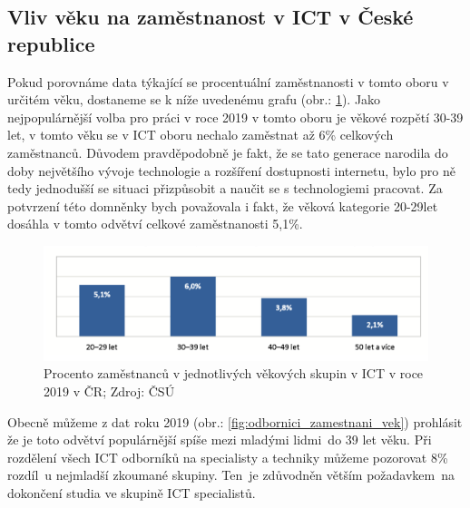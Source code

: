 \documentclass[12pt]{report}			%
\begin{document}
            \subsection{Vliv věku na zaměstnanost v ICT v České republice}
                
                Pokud porovnáme data týkající se procentuální zaměstnanosti v tomto oboru v určitém věku, dostaneme se k níže uvedenému grafu (obr.: \ref{fig:odbornici_vek}). Jako nejpopulárnější volba pro práci v roce 2019 v tomto oboru je věkové rozpětí 30-39 let, v tomto věku se v ICT oboru nechalo zaměstnat až 6\% celkových zaměstnanců. Důvodem pravděpodobně je fakt, že se tato generace narodila do doby největšího vývoje technologie a rozšíření dostupnosti internetu, bylo pro ně tedy jednodušší se situaci přizpůsobit a naučit se s technologiemi pracovat. Za potvrzení této domněnky bych považovala i fakt, že věková kategorie 20-29let dosáhla v tomto odvětví celkové zaměstnanosti 5,1\%. ~\cite{InternetMadePublic}
                
                \begin{figure}[h]
                    \centering
                     \includegraphics[width=16cm]{Maturitni Prace/images/odbornici_vek.png}  
                     \caption[Procento zaměstnanců v jednotlivých věkových skupin v ICT v ČR 2019]{Procento zaměstnanců v jednotlivých věkových skupin v ICT v roce 2019 v ČR; Zdroj: ČSÚ}
                     \label{fig:odbornici_vek}
                \end{figure}
                
                Obecně můžeme z dat roku 2019 (obr.: \ref{fig:odbornici_zamestnani_vek}) prohlásit že je toto odvětví populárnější spíše mezi mladými lidmi~do 39 let věku. Při rozdělení všech ICT odborníků na specialisty a techniky můžeme pozorovat 8\% rozdíl~u nejmladší zkoumané skupiny. Ten~je zdůvodněn větším požadavkem~na dokončení studia ve skupině ICT specialistů.~\cite{LidskeZdrojeVIT}
                
\end{document}
